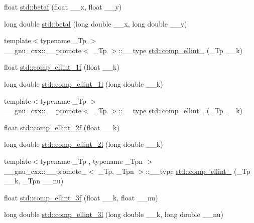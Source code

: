 \begin{DoxyCompactItemize}
\item 
float \hyperlink{group__tr29124__math__spec__func_gaf577572796d25206ee269c429d04400b}{std\+::betaf} (float \+\_\+\+\_\+x, float \+\_\+\+\_\+y)
\item 
long double \hyperlink{group__tr29124__math__spec__func_ga66de58126badd203360010f431fe7f63}{std\+::betal} (long double \+\_\+\+\_\+x, long double \+\_\+\+\_\+y)
\item 
{\footnotesize template$<$typename \+\_\+\+Tp $>$ }\\\+\_\+\+\_\+gnu\+\_\+cxx\+::\+\_\+\+\_\+promote$<$ \+\_\+\+Tp $>$\+::\+\_\+\+\_\+type \hyperlink{group__tr29124__math__spec__func_gac559500c604c43ea943d593c9ad9d289}{std\+::comp\+\_\+ellint\+\_} (\+\_\+\+Tp \+\_\+\+\_\+k)
\item 
float \hyperlink{group__tr29124__math__spec__func_ga7fb5be999a8125cf7e55e630eb8444a1}{std\+::comp\+\_\+ellint\+\_\+1f} (float \+\_\+\+\_\+k)
\item 
long double \hyperlink{group__tr29124__math__spec__func_ga7247d3dd77c1ff5df3c059fed862dc48}{std\+::comp\+\_\+ellint\+\_\+1l} (long double \+\_\+\+\_\+k)
\item 
{\footnotesize template$<$typename \+\_\+\+Tp $>$ }\\\+\_\+\+\_\+gnu\+\_\+cxx\+::\+\_\+\+\_\+promote$<$ \+\_\+\+Tp $>$\+::\+\_\+\+\_\+type \hyperlink{group__tr29124__math__spec__func_ga22fcc678829f0daf2de257896378e7e0}{std\+::comp\+\_\+ellint\+\_} (\+\_\+\+Tp \+\_\+\+\_\+k)
\item 
float \hyperlink{group__tr29124__math__spec__func_ga21700f2f125c42b1f1da1f9c7eea1135}{std\+::comp\+\_\+ellint\+\_\+2f} (float \+\_\+\+\_\+k)
\item 
long double \hyperlink{group__tr29124__math__spec__func_ga47b647ec386c8d4b18a030c97842df18}{std\+::comp\+\_\+ellint\+\_\+2l} (long double \+\_\+\+\_\+k)
\item 
{\footnotesize template$<$typename \+\_\+\+Tp , typename \+\_\+\+Tpn $>$ }\\\+\_\+\+\_\+gnu\+\_\+cxx\+::\+\_\+\+\_\+promote\+\_$<$ \+\_\+\+Tp, \+\_\+\+Tpn $>$\+::\+\_\+\+\_\+type \hyperlink{group__tr29124__math__spec__func_gad833404645e24b7f0598a640ff92d623}{std\+::comp\+\_\+ellint\+\_} (\+\_\+\+Tp \+\_\+\+\_\+k, \+\_\+\+Tpn \+\_\+\+\_\+nu)
\item 
float \hyperlink{group__tr29124__math__spec__func_ga76834d3112f777703330892303267a39}{std\+::comp\+\_\+ellint\+\_\+3f} (float \+\_\+\+\_\+k, float \+\_\+\+\_\+nu)
\item 
long double \hyperlink{group__tr29124__math__spec__func_ga1ca081fee102cd0d4d6b091285e495e5}{std\+::comp\+\_\+ellint\+\_\+3l} (long double \+\_\+\+\_\+k, long double \+\_\+\+\_\+nu)

\end{DoxyCompactItemize}

